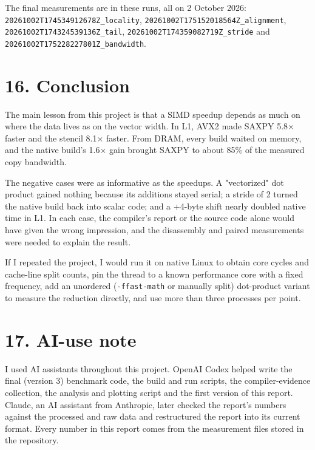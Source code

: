 \documentclass[10pt,letterpaper]{article}
\begin{document}
The final measurements are in these runs, all on 2 October 2026: \texttt{20261002T174534912678Z\_locality}, \texttt{20261002T175152018564Z\_alignment}, \texttt{20261002T174324539136Z\_tail}, \texttt{20261002T174359082719Z\_stride} and \texttt{20261002T175228227801Z\_bandwidth}.


\section*{16. Conclusion}

The main lesson from this project is that a SIMD speedup depends as much on where the data lives as on the vector width. In L1, AVX2 made SAXPY 5.8$\times$ faster and the stencil 8.1$\times$ faster. From DRAM, every build waited on memory, and the native build's 1.6$\times$ gain brought SAXPY to about 85\% of the measured copy bandwidth.


The negative cases were as informative as the speedups. A "vectorized" dot product gained nothing because its additions stayed serial; a stride of 2 turned the native build back into scalar code; and a +4-byte shift nearly doubled native time in L1. In each case, the compiler's report or the source code alone would have given the wrong impression, and the disassembly and paired measurements were needed to explain the result.


If I repeated the project, I would run it on native Linux to obtain core cycles and cache-line split counts, pin the thread to a known performance core with a fixed frequency, add an unordered (\texttt{-ffast-math} or manually split) dot-product variant to measure the reduction directly, and use more than three processes per point.


\section*{17. AI-use note}

I used AI assistants throughout this project. OpenAI Codex helped write the final (version 3) benchmark code, the build and run scripts, the compiler-evidence collection, the analysis and plotting script and the first version of this report. Claude, an AI assistant from Anthropic, later checked the report's numbers against the processed and raw data and restructured the report into its current format. Every number in this report comes from the measurement files stored in the repository.
\end{document}
